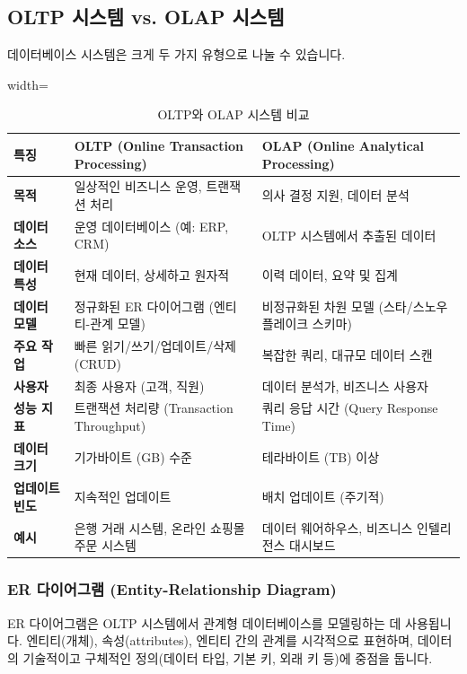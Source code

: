 \documentclass[11pt,a4paper]{article}
\begin{document}
\subsection{OLTP 시스템 vs. OLAP 시스템}

데이터베이스 시스템은 크게 두 가지 유형으로 나눌 수 있습니다.

\begin{table}[h!]
\centering
\caption{OLTP와 OLAP 시스템 비교}
\label{tab:oltp_olap_comparison}
\begin{adjustbox}{width=\textwidth}
\begin{tabular}{p{}p{}p{}}
\toprule
\textbf{특징} & \textbf{OLTP (Online Transaction Processing)} & \textbf{OLAP (Online Analytical Processing)} \\
\midrule
\textbf{목적} & 일상적인 비즈니스 운영, 트랜잭션 처리 & 의사 결정 지원, 데이터 분석 \\
\textbf{데이터 소스} & 운영 데이터베이스 (예: ERP, CRM) & OLTP 시스템에서 추출된 데이터 \\
\textbf{데이터 특성} & 현재 데이터, 상세하고 원자적 & 이력 데이터, 요약 및 집계 \\
\textbf{데이터 모델} & 정규화된 ER 다이어그램 (엔티티-관계 모델) & 비정규화된 차원 모델 (스타/스노우플레이크 스키마) \\
\textbf{주요 작업} & 빠른 읽기/쓰기/업데이트/삭제 (CRUD) & 복잡한 쿼리, 대규모 데이터 스캔 \\
\textbf{사용자} & 최종 사용자 (고객, 직원) & 데이터 분석가, 비즈니스 사용자 \\
\textbf{성능 지표} & 트랜잭션 처리량 (Transaction Throughput) & 쿼리 응답 시간 (Query Response Time) \\
\textbf{데이터 크기} & 기가바이트 (GB) 수준 & 테라바이트 (TB) 이상 \\
\textbf{업데이트 빈도} & 지속적인 업데이트 & 배치 업데이트 (주기적) \\
\textbf{예시} & 은행 거래 시스템, 온라인 쇼핑몰 주문 시스템 & 데이터 웨어하우스, 비즈니스 인텔리전스 대시보드 \\
\bottomrule
\end{tabular}
\end{adjustbox}
\end{table}

\subsubsection{ER 다이어그램 (Entity-Relationship Diagram)}
ER 다이어그램은 OLTP 시스템에서 관계형 데이터베이스를 모델링하는 데 사용됩니다. 엔티티(개체), 속성(attributes), 엔티티 간의 관계를 시각적으로 표현하며, 데이터의 기술적이고 구체적인 정의(데이터 타입, 기본 키, 외래 키 등)에 중점을 둡니다.
\end{document}
